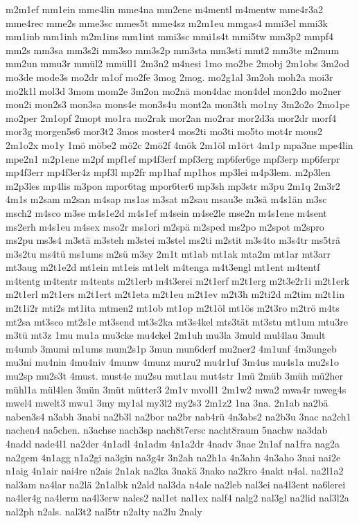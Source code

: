 {m2m1ef
mm1ein
mme4lin
mme4na
mm2ene
m4mentl
m4mentw
mme4r3a2
mme4rec
mme2s
mme3sc
mmes5t
mme4sz
m2m1eu
mmgas4
mmi3el
mmi3k
mm1inb
mm1inh
m2m1ins
mm1int
mmi3sc
mmi1s4t
mmi5tw
mm3p2
mmpf4
mm2s
mm3sa
mm3s2i
mm3so
mm3s2p
mm3sta
mm3sti
mmt2
mm3te
m2mum
mm2un
mmu3r
mmül2
mmüll1
2m3n2
m4nesi
1mo
mo2be
2mobj
2m1obs
3m2od
mo3de
mode3s
mo2dr
m1of
mo2fe
3mog
2mog.
mo2g1al
3m2oh
moh2a
moi3r
mo2k1l
mol3d
3mom
mom2e
3m2on
mo2nä
mon4dac
mon4del
mon2do
mo2ner
mon2i
mon2s3
mon3sa
mons4e
mon3s4u
mont2a
mon3th
mo1ny
3m2o2o
2mo1pe
mo2per
2m1opf
2mopt
mo1ra
mo2rak
mor2an
mo2rar
mor2d3a
mor2dr
morf4
mor3g
morgen5s6
mor3t2
3mos
moster4
mos2ti
mo3ti
mo5to
mot4r
mous2
2m1o2x
mo1y
1mö
möbe2
mö2c
2mö2f
4mök
2m1öl
m1ört
4m1p
mpa3ne
mpe4lin
mpe2n1
m2p1ene
m2pf
mpf1ef
mp4f3erf
mpf3erg
mp6fer6ge
mpf3erp
mp6ferpr
mp4f3err
mp4f3er4z
mpf3l
mp2fr
mp1haf
mp1hos
mp3lei
m4p3lem.
m2p3len
m2p3les
mp4lis
m3pon
mpor6tag
mpor6ter6
mp3sh
mp3str
m3pu
2m1q
2m3r2
4m1s
m2sam
m2san
m4sap
ms1as
m3sat
m2sau
msau3e
m3sä
m4s1än
m3sc
msch2
m4sco
m3se
m4s1e2d
m4s1ef
m4sein
m4se2le
mse2n
m4s1ene
m4sent
ms2erh
m4s1eu
m4sex
mso2r
ms1ori
m2spä
m2sped
ms2po
m2spot
m2spro
ms2pu
ms3s4
m3stä
m3steh
m3stei
m3stel
ms2ti
m2stit
m3s4to
m3s4tr
ms5trä
m3s2tu
ms4tü
ms1ums
m2sü
m3sy
2m1t
mt1ab
mt1ak
mta2m
mt1ar
mt3arr
mt3aug
m2t1e2d
mt1ein
mt1eis
mt1elt
m4tenga
m4t3engl
mt1ent
m4tentf
m4tentg
m4tentr
m4tents
m2t1erb
m4t3erei
m2t1erf
m2t1erg
m2t3e2r1i
m2t1erk
m2t1erl
m2t1ers
m2t1ert
m2t1eta
m2t1eu
m2t1ev
m2t3h
m2ti2d
m2tim
m2t1in
m2t1i2r
mti2s
mt1ita
mtmen2
mt1ob
mt1op
m2t1öl
mt1ös
m2t3ro
m2trö
m4ts
mt2sa
mt3sco
mt2s1e
mt3send
mt3s2ka
mt3s4kel
mts3tät
mt3stu
mt1um
mtu3re
m3tü
mt3z
1mu
mu1a
mu3cke
mu4ckel
2m1uh
mu3la
3muld
mul4lau
3mult
m4umb
3mumi
m1ums
mum2s1p
3mun
mun6derf
mu2ner2
4m1unf
4m3ungeb
mu3ni
mu4nin
4mu4niv
4munw
4munz
muru2
mu4r1uf
3m4us
mu4s1a
mu2s1o
mu2sp
mu2s3t
4must.
must4e
mu2su
mut1au
mut4str
1mü
2müb
3müh
mü2her
mühl1a
mül4len
3mün
3müt
mütter3
2m1v
mvoll1
2m1w2
mwa2
mwa4r
mweg4s
mwel4
mwelt3
mwu1
3my
my1al
my3l2
my2s3
2m1z2
1na
3na.
2n1ab
na2bä
naben3s4
n3abh
3nabi
na2b3l
na2bor
na2br
nab4rü
4n3abs2
na2b3u
3nac
na2ch1
nachen4
na5chen.
n3achse
nach3sp
nach8t7ersc
nacht8raum
5nachw
na3dab
4nadd
nade4l1
na2der
4n1adl
4n1adm
4n1a2dr
4nadv
3nae
2n1af
na1fra
nag2a
na2gem
4n1agg
n1a2gi
na3gin
na3g4r
3n2ah
na2h1a
4n3ahn
4n3aho
3nai
nai2e
n1aig
4n1air
nai4re
n2ais
2n1ak
na2ka
3nakä
3nako
na2kro
4nakt
n4al.
na2l1a2
nal3am
na4lar
na2lä
2n1albk
n2ald
nal3da
n4ale
na2leb
nal3ei
na4l3ent
na6lerei
na4ler4g
na4lerm
na4l3erw
nales2
nal1et
nal1ex
nalf4
nalg2
nal3gl
na2lid
nal3l2a
nal2ph
n2als.
nal3t2
nal5tr
n2alty
na2lu
2naly
}
